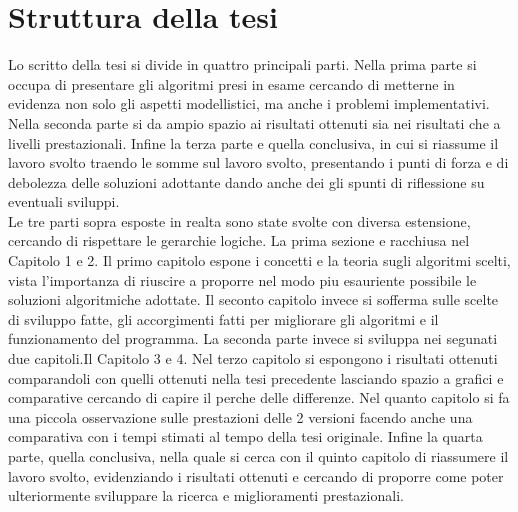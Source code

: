 \section{Struttura della tesi}
Lo scritto della tesi si divide in quattro principali parti.
Nella prima parte si occupa di presentare gli algoritmi presi in esame cercando di metterne in evidenza
non solo gli aspetti modellistici, ma anche i problemi implementativi.
Nella seconda parte si da ampio spazio ai risultati ottenuti sia nei risultati che a livelli
prestazionali.
Infine la terza parte e quella conclusiva, in cui si riassume il lavoro svolto traendo
le somme sul lavoro svolto, presentando i punti di forza e di debolezza delle soluzioni
adottante dando anche dei gli spunti di riflessione su eventuali sviluppi.\\

Le tre parti sopra esposte in realta sono state svolte con diversa estensione,
cercando di rispettare le gerarchie logiche.
La prima sezione e racchiusa nel Capitolo 1 e 2.
Il primo capitolo espone i concetti e la teoria sugli algoritmi scelti, vista l'importanza di
riuscire a proporre nel modo piu esauriente possibile le soluzioni algoritmiche
adottate. Il seconto capitolo invece si sofferma sulle scelte di sviluppo fatte, gli accorgimenti fatti per migliorare
gli algoritmi e il funzionamento del programma.
La seconda parte invece si sviluppa nei segunati due capitoli.Il Capitolo 3 e 4.
Nel terzo capitolo si espongono i risultati ottenuti comparandoli con quelli
ottenuti nella tesi precedente lasciando spazio a grafici e comparative cercando
di capire il perche delle differenze.
Nel quanto capitolo si fa una piccola osservazione sulle prestazioni delle 2 versioni
facendo anche una comparativa con i tempi stimati al tempo della tesi originale.
Infine la quarta parte, quella conclusiva, nella quale si cerca con il quinto capitolo
di riassumere il lavoro svolto, evidenziando i risultati ottenuti e cercando
di proporre come poter ulteriormente sviluppare la ricerca e miglioramenti prestazionali.
